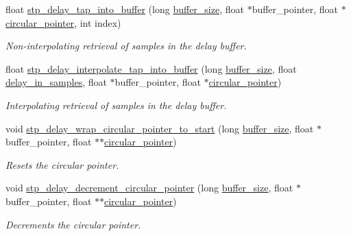 \begin{DoxyCompactItemize}
float \hyperlink{structstp__delay_a26d9061428adafc706946d8c63452f84}{stp\+\_\+delay\+\_\+tap\+\_\+into\+\_\+buffer} (long \hyperlink{structstp__delay_ac0b5d1ec75d16c57ad6376f09c9693ca}{buffer\+\_\+size}, float $\ast$buffer\+\_\+pointer, float $\ast$\hyperlink{structstp__delay_a8ae11daccf5b56bb5a49c9a99956d23a}{circular\+\_\+pointer}, int index)
\begin{DoxyCompactList}\small\item\em Non-\/interpolating retrieval of samples in the delay buffer. ~\newline
 \end{DoxyCompactList}\item 
float \hyperlink{structstp__delay_ae1939d094a58d97c948543a0fc87e89a}{stp\+\_\+delay\+\_\+interpolate\+\_\+tap\+\_\+into\+\_\+buffer} (long \hyperlink{structstp__delay_ac0b5d1ec75d16c57ad6376f09c9693ca}{buffer\+\_\+size}, float \hyperlink{structstp__delay_a1e57a43103f17324d4e3f4132fc8d195}{delay\+\_\+in\+\_\+samples}, float $\ast$buffer\+\_\+pointer, float $\ast$\hyperlink{structstp__delay_a8ae11daccf5b56bb5a49c9a99956d23a}{circular\+\_\+pointer})
\begin{DoxyCompactList}\small\item\em Interpolating retrieval of samples in the delay buffer. ~\newline
 \end{DoxyCompactList}\item 
void \hyperlink{structstp__delay_a3e4604fbffa850674871f575f9f93967}{stp\+\_\+delay\+\_\+wrap\+\_\+circular\+\_\+pointer\+\_\+to\+\_\+start} (long \hyperlink{structstp__delay_ac0b5d1ec75d16c57ad6376f09c9693ca}{buffer\+\_\+size}, float $\ast$buffer\+\_\+pointer, float $\ast$$\ast$\hyperlink{structstp__delay_a8ae11daccf5b56bb5a49c9a99956d23a}{circular\+\_\+pointer})
\begin{DoxyCompactList}\small\item\em Resets the circular pointer. ~\newline
 \end{DoxyCompactList}\item 
void \hyperlink{structstp__delay_a113435fd3ee00f76077d1029bcf3ea58}{stp\+\_\+delay\+\_\+decrement\+\_\+circular\+\_\+pointer} (long \hyperlink{structstp__delay_ac0b5d1ec75d16c57ad6376f09c9693ca}{buffer\+\_\+size}, float $\ast$buffer\+\_\+pointer, float $\ast$$\ast$\hyperlink{structstp__delay_a8ae11daccf5b56bb5a49c9a99956d23a}{circular\+\_\+pointer})
\begin{DoxyCompactList}\small\item\em Decrements the circular pointer. ~\newline
 \end{DoxyCompactList}\end{DoxyCompactItemize}


